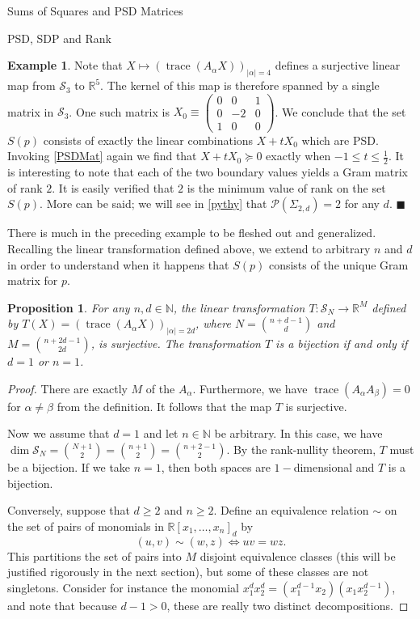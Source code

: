 \documentclass[12pt,oneside,final]{ucthesisucsbmath2010}
\newcommand{\QED}{\blacksquare}
\newcommand{\R}{\mathbb{R}}
\newcommand{\N}{\mathbb{N}}
\newcommand{\s}{\mathcal{S}}
\newcommand{\p}{\mathcal{P}}
\newcommand{\pn}{\R[x_1,\ldots,x_n]}
\DeclareMathOperator{\trace}{trace}
\newtheorem{prop}[thm]{Proposition}
\theoremstyle{definition}
\newtheorem{examp}[thm]{Example}
\begin{document}
\begin{chapter}{Sums of Squares and PSD Matrices}
\begin{section}{PSD, SDP and Rank}
\begin{examp}
Note that $X \longmapsto (\trace(A_\alpha X))_{|\alpha|=4}$ defines a surjective linear map from $\s_3$ to $\R^5$. The kernel of this map is therefore spanned by a single matrix in $\s_3$. One such matrix is $X_0 \equiv \left(\begin{smallmatrix*} 0 & 0 & 1 \\ 0 & -2 & 0  \\ 1&0&0 \end{smallmatrix*}\right)$. We conclude that the set $S(p)$ consists of exactly the linear combinations $X+tX_0$ which are PSD. Invoking \ref{PSDMat} again we find that $X+tX_0 \succeq0$ exactly when $-1 \leq t \leq \frac{1}{2}$. It is interesting to note that each of the two boundary values yields a Gram matrix of rank $2$. It is easily verified that $2$ is the minimum value of rank on the set $S(p)$. More can be said; we will see in \ref{pythy} that $\p(\Sigma_{2,d}) = 2$ for any $d$. $\QED$
\label{example1}
\end{examp}

There is much in the preceding example to be fleshed out and generalized. Recalling the linear transformation defined above, we extend to arbitrary $n$ and $d$ in order to understand when it happens that $S(p)$ consists of the unique Gram matrix for $p$.

\begin{prop} For any $n,d \in \N$, the linear transformation $T:\s_N \to \R^M$ defined by $T(X)=(\trace(A_\alpha X))_{|\alpha|=2d}$, where $N=\binom{n+d-1}{d}$ and $M = \binom{n+2d-1}{2d}$, is surjective. The transformation $T$ is a bijection if and only if $d=1$ or $n=1$. 
\label{SN+squash}
\end{prop}

\begin{proof} There are exactly $M$ of the $A_\alpha$. Furthermore, we have $\trace(A_\alpha A_\beta) = 0$ for $\alpha \neq \beta$ from the definition. It follows that the map $T$ is surjective.

Now we assume that $d=1$ and let $n\in \N$ be arbitrary. In this case, we have $\dim \s_N = \binom{N+1}{2} = \binom{n+1}{2} = \binom{n+2-1}{2}$. By the rank-nullity theorem, $T$ must be a bijection. If we take $n=1$, then both spaces are $1-$dimensional and $T$ is a bijection.

Conversely, suppose that $d\geq 2$ and $n\geq 2$. Define an equivalence relation $\sim$ on the set of pairs of monomials in $\pn_d$ by 
\[(u,v) \sim (w,z) \iff uv=wz.\]
This partitions the set of pairs into $M$ disjoint equivalence classes (this will be justified rigorously in the next section), but some of these classes are not singletons. Consider for instance the monomial $x_1^dx_2^d=(x_1^{d-1}x_2)(x_1x_2^{d-1})$, and note that because $d-1>0$, these are really two distinct decompositions.
\end{proof}


\end{section}
\end{chapter}
\end{document}
